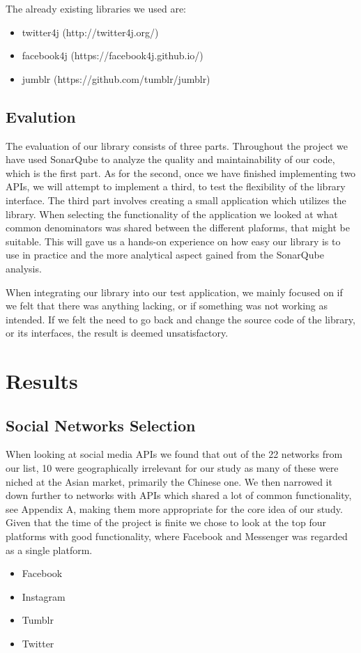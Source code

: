 \documentclass{sigchi-alternate}
\begin{document}
The already existing libraries we used are:
\begin{itemize}
	\item twitter4j (http://twitter4j.org/)
	\item facebook4j (https://facebook4j.github.io/)
	\item jumblr (https://github.com/tumblr/jumblr)
\end{itemize}
\subsection{Evalution}
The evaluation of our library consists of three parts. Throughout the project we have used SonarQube to analyze the quality and maintainability of our code, which is the first part. As for the second, once we have finished
implementing two APIs, we will attempt to implement a third, to test the flexibility of the library interface. The third part involves creating a small application which utilizes the library. When selecting the functionality 
of the application we looked at what common denominators was shared between the different plaforms, that might be suitable. This will gave us a hands-on experience on how easy our library is to use in practice and the more 
analytical aspect gained from the SonarQube analysis.

When integrating our library into our test application, we mainly focused on if we felt that there was anything lacking, or if something was not working as intended. If we felt the need to go back and
change the source code of the library, or its interfaces, the result is deemed unsatisfactory. 

\section{Results}
\subsection{Social Networks Selection}
When looking at social media APIs we found that out of the 22 networks from our list\autocite{STATISTA_LEADING_SOCIAL_NETWORKS}, 10 were geographically irrelevant for our study as many of these were
niched at the Asian market, primarily the Chinese one. We then narrowed it down further to networks with APIs which shared a lot of common functionality, see Appendix A, making them more appropriate for the core idea
of our study. Given that the time of the project is finite we chose to look at the top four platforms with good functionality, where Facebook and Messenger was regarded as a single platform.
\begin{itemize}
	\item Facebook
	\item Instagram
	\item Tumblr
	\item Twitter
\end{itemize}
\end{document}
